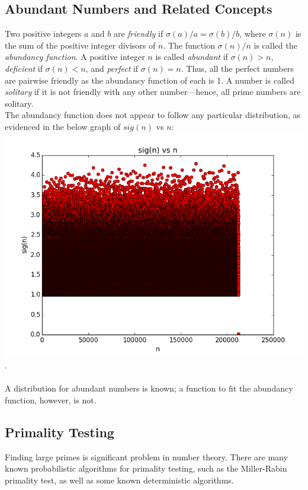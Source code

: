\documentclass[11pt]{article}
\begin{document}
\subsection{Abundant Numbers and Related Concepts}
Two positive integers $a$ and $b$ are \textit{friendly} if $\sigma(a)/a = \sigma(b)/b$, where $\sigma(n)$ is the sum of the positive integer divisors of $n$.
The function $\sigma(n)/n$ is called the \textit{abundancy function}. A positive integer $n$ is called \textit{abundant} if $\sigma(n) > n$, \textit{deficient} if $\sigma(n) < n$, and \textit{perfect} if $\sigma(n) = n$. Thus, all the perfect numbers are pairwise friendly as the abundancy function of each is 1. A number is called \textit{solitary} if it is not friendly with any other number---hence, all prime numbers are solitary.
\\
The abundancy function does not appear to follow any particular distribution, as evidenced in the below graph of $sig(n)$ vs $n$: 
\includegraphics[scale=0.5]{sign_vs_n_large_nums.png}. \\ \\A distribution for abundant numbers is known; a function to fit the abundancy function, however, is not. \\


\subsection{Primality Testing}

Finding large primes is significant problem in number theory. There are many known probabilistic algorithms for primality testing, such as the Miller-Rabin primality test, as well as some known deterministic algorithms. 
\end{document}
